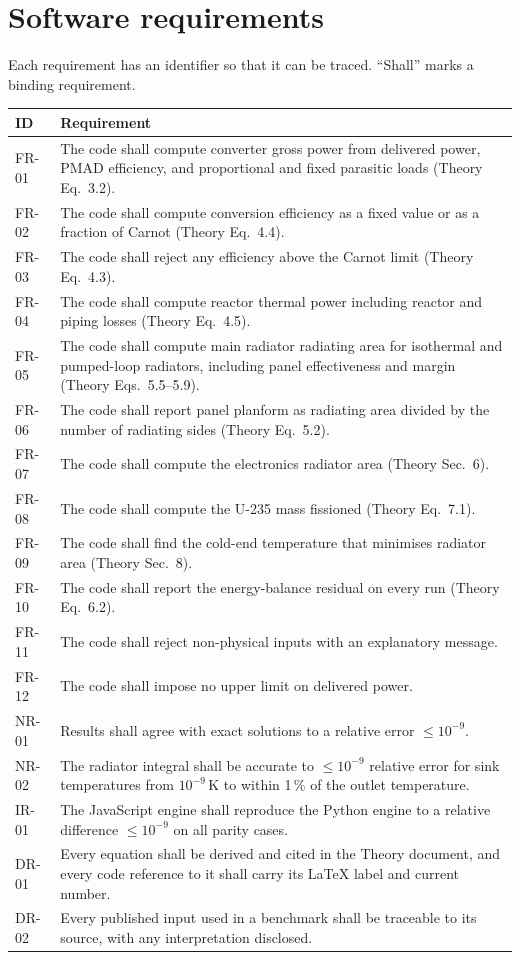 \documentclass[11pt]{article}
\begin{document}
\section{Software requirements}\label{sec:req}
Each requirement has an identifier so that it can be traced. ``Shall'' marks a binding
requirement.
\begin{longtable}{>{\ttfamily}p{}p{}}
\toprule
ID & Requirement \\
\midrule
\endhead
FR-01 & The code shall compute converter gross power from delivered power, PMAD efficiency, and proportional and fixed parasitic loads (Theory Eq.~3.2). \\
FR-02 & The code shall compute conversion efficiency as a fixed value or as a fraction of Carnot (Theory Eq.~4.4). \\
FR-03 & The code shall reject any efficiency above the Carnot limit (Theory Eq.~4.3). \\
FR-04 & The code shall compute reactor thermal power including reactor and piping losses (Theory Eq.~4.5). \\
FR-05 & The code shall compute main radiator radiating area for isothermal and pumped-loop radiators, including panel effectiveness and margin (Theory Eqs.~5.5--5.9). \\
FR-06 & The code shall report panel planform as radiating area divided by the number of radiating sides (Theory Eq.~5.2). \\
FR-07 & The code shall compute the electronics radiator area (Theory Sec.~6). \\
FR-08 & The code shall compute the U-235 mass fissioned (Theory Eq.~7.1). \\
FR-09 & The code shall find the cold-end temperature that minimises radiator area (Theory Sec.~8). \\
FR-10 & The code shall report the energy-balance residual on every run (Theory Eq.~6.2). \\
FR-11 & The code shall reject non-physical inputs with an explanatory message. \\
FR-12 & The code shall impose no upper limit on delivered power. \\
NR-01 & Results shall agree with exact solutions to a relative error $\le10^{-9}$. \\
NR-02 & The radiator integral shall be accurate to $\le10^{-9}$ relative error for sink temperatures from $10^{-9}$\,K to within 1\,\% of the outlet temperature. \\
IR-01 & The JavaScript engine shall reproduce the Python engine to a relative difference $\le10^{-9}$ on all parity cases. \\
DR-01 & Every equation shall be derived and cited in the Theory document, and every code reference to it shall carry its LaTeX label and current number. \\
DR-02 & Every published input used in a benchmark shall be traceable to its source, with any interpretation disclosed. \\
\bottomrule
\end{longtable}
\end{document}

